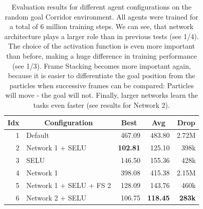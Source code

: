 \begin{table}[htp]
    \begin{center}
        \begin{tabular}{rlrrr}
            \toprule
            \multicolumn{1}{c}{Idx} & \multicolumn{1}{c}{Configuration} & \multicolumn{1}{c}{Best} & \multicolumn{1}{c}{Avg} & \multicolumn{1}{c}{Drop}\\
            \midrule
            1 & Default & 467.09 & 483.80 & 2.72M \\
            2 & Network 1 + SELU & \textbf{102.81} & 125.10 & 398k \\
            3 & SELU & 146.50 & 155.36 & 428k \\
            4 & Network 1 & 398.08 & 415.38 & 2.15M \\ 
            5 & Network 1 + SELU + FS 2 & 128.09 & 143.76 & 460k \\
            6 & Network 2 + SELU & 106.75 & \textbf{118.45} & \textbf{283k} \\
            \bottomrule
        \end{tabular}
    \end{center}
    \caption[Evaluation Results for Different Agents on the Random Goal Corridor Environment]{Evaluation results for different agent configurations on the random goal Corridor environment. All agents were trained for a total of 6 million training steps. We can see, that network architecture plays a larger role than in previous tests (see 1/4). The choice of the activation function is even more important than before, making a huge difference in training performance (see 1/3). Frame Stacking becomes more important again, because it is easier to differentiate the goal position from the particles when successive frames can be compared: Particles will move - the goal will not. Finally, larger networks learn the tasks even faster (see results for Network 2).} \label{tab:Eval/RandomGoal/Maze0318}
\end{table}

